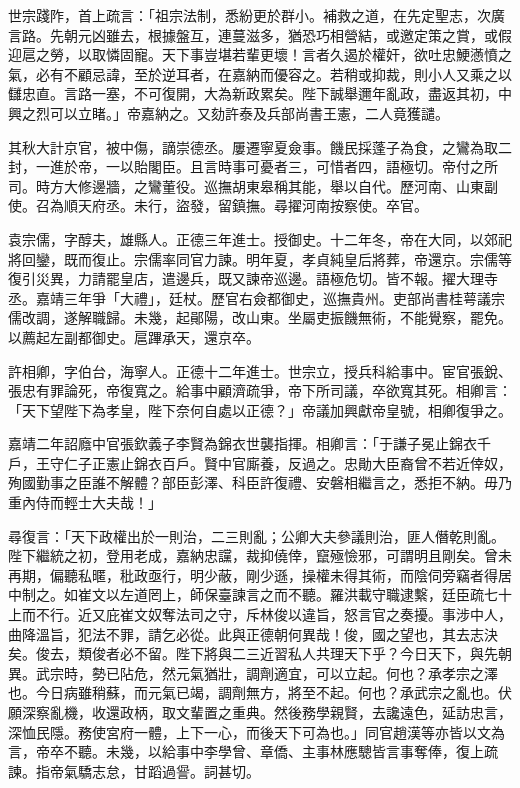 \begin{pinyinscope}
世宗踐阼，首上疏言：「祖宗法制，悉紛更於群小。補救之道，在先定聖志，次廣言路。先朝元凶雖去，根據盤互，連蔓滋多，猶恐巧相營結，或邀定策之賞，或假迎扈之勞，以取憐固寵。天下事豈堪若輩更壞！言者久遏於權奸，欲吐忠鯁懣憤之氣，必有不顧忌諱，至於逆耳者，在嘉納而優容之。若稍或抑裁，則小人又乘之以讎忠直。言路一塞，不可復開，大為新政累矣。陛下誠舉邇年亂政，盡返其初，中興之烈可以立睹。」帝嘉納之。又劾許泰及兵部尚書王憲，二人竟獲譴。

其秋大計京官，被中傷，謫崇德丞。屢遷寧夏僉事。饑民採蓬子為食，之鸞為取二封，一進於帝，一以貽閣臣。且言時事可憂者三，可惜者四，語極切。帝付之所司。時方大修邊牆，之鸞董役。巡撫胡東皋稱其能，舉以自代。歷河南、山東副使。召為順天府丞。未行，盜發，留鎮撫。尋擢河南按察使。卒官。

袁宗儒，字醇夫，雄縣人。正德三年進士。授御史。十二年冬，帝在大同，以郊祀將回鑾，既而復止。宗儒率同官力諫。明年夏，孝貞純皇后將葬，帝還京。宗儒等復引災異，力請罷皇店，遣邊兵，既又諫帝巡邊。語極危切。皆不報。擢大理寺丞。嘉靖三年爭「大禮」，廷杖。歷官右僉都御史，巡撫貴州。吏部尚書桂萼議宗儒改調，遂解職歸。未幾，起鄖陽，改山東。坐屬吏振饑無術，不能覺察，罷免。以薦起左副都御史。扈蹕承天，還京卒。

許相卿，字伯台，海寧人。正德十二年進士。世宗立，授兵科給事中。宦官張銳、張忠有罪論死，帝復寬之。給事中顧濟疏爭，帝下所司議，卒欲寬其死。相卿言：「天下望陛下為孝皇，陛下奈何自處以正德？」帝議加興獻帝皇號，相卿復爭之。

嘉靖二年詔廕中官張欽義子李賢為錦衣世襲指揮。相卿言：「于謙子冕止錦衣千戶，王守仁子正憲止錦衣百戶。賢中官廝養，反過之。忠勛大臣裔曾不若近倖奴，殉國勤事之臣誰不解體？部臣彭澤、科臣許復禮、安磐相繼言之，悉拒不納。毋乃重內侍而輕士大夫哉！」

尋復言：「天下政權出於一則治，二三則亂；公卿大夫參議則治，匪人僭乾則亂。陛下繼統之初，登用老成，嘉納忠讜，裁抑僥倖，竄殛憸邪，可謂明且剛矣。曾未再期，偏聽私暱，秕政亟行，明少蔽，剛少遜，操權未得其術，而陰伺旁竊者得居中制之。如崔文以左道罔上，師保臺諫言之而不聽。羅洪載守職逮繫，廷臣疏七十上而不行。近又庇崔文奴奪法司之守，斥林俊以違旨，怒言官之奏擾。事涉中人，曲降溫旨，犯法不罪，請乞必從。此與正德朝何異哉！俊，國之望也，其去志決矣。俊去，類俊者必不留。陛下將與二三近習私人共理天下乎？今日天下，與先朝異。武宗時，勢已阽危，然元氣猶壯，調劑適宜，可以立起。何也？承孝宗之澤也。今日病雖稍蘇，而元氣已竭，調劑無方，將至不起。何也？承武宗之亂也。伏願深察亂機，收還政柄，取文輩置之重典。然後務學親賢，去讒遠色，延訪忠言，深恤民隱。務使宮府一體，上下一心，而後天下可為也。」同官趙漢等亦皆以文為言，帝卒不聽。未幾，以給事中李學曾、章僑、主事林應驄皆言事奪俸，復上疏諫。指帝氣驕志怠，甘蹈過諐。詞甚切。


\end{pinyinscope}
